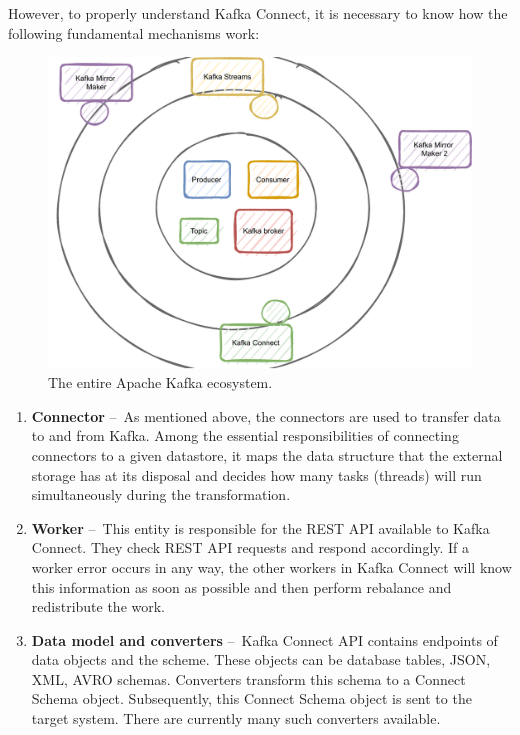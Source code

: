 However, to properly understand Kafka Connect, it is necessary to know how the following fundamental mechanisms work:

\begin{figure}[!ht]
    \centering
    \includegraphics[scale=0.8]{obrazky-figures/02-preliminaries/02-kafka/12-all-in-one.pdf}
    \caption{The entire Apache Kafka ecosystem.}
    \label{fig:02-ecosystem-of-kafka}
\end{figure}

\begin{enumerate}
    \item \textbf{Connector} \---\ As mentioned above, the connectors are used to transfer data to and from Kafka.
    Among the essential responsibilities of connecting connectors to a given datastore, it maps the data structure that the external storage has at its disposal and decides how many tasks (threads) will run simultaneously during the transformation.
    \item \textbf{Worker} \---\ This entity is responsible for the REST API available to Kafka Connect.
    They check REST API requests and respond accordingly.
    If a worker error occurs in any way, the other workers in Kafka Connect will know this information as soon as possible and then perform rebalance and redistribute the work.
    \item \textbf{Data model and converters} \---\ Kafka Connect API contains endpoints of data objects and the scheme.
    These objects can be database tables, JSON, XML, AVRO schemas.
    Converters transform this schema to a Connect Schema object.
    Subsequently, this Connect Schema object is sent to the target system.
    There are currently many such converters available.
\end{enumerate}


